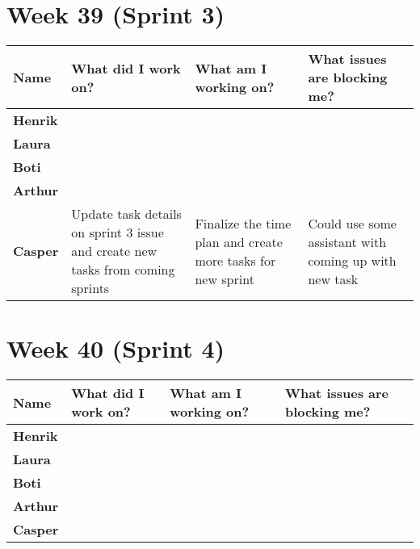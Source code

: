 \documentclass[landscape]{article}
\begin{document}
    \section{Week 39 (Sprint 3)}
    \begin{table}[H]
        \begin{center}
            \begin{tabularx}{\linewidth}{L|L|L|L}
                
                \textbf{Name} & \textbf{What did I work on?} & \textbf{What am I working on? }& \textbf{What issues are blocking me?} \\
                \hline
                \textbf{Henrik} &  &  &  \\
                \hline
                \textbf{Laura} & & & \\
                \hline
                \textbf{Boti} & & & \\
                \hline
                \textbf{Arthur} & & & \\
                \hline
                \textbf{Casper} & Update task details on sprint 3 issue and
                create new tasks from coming sprints & Finalize the time plan
                and create more tasks for new sprint & Could use some assistant
                with coming up with new task
            \end{tabularx}
        \end{center}
    \end{table}

    \section{Week 40 (Sprint 4)}
    \begin{table}[H]
        \begin{center}
            \begin{tabularx}{\linewidth}{L|L|L|L}
                
                \textbf{Name} & \textbf{What did I work on?} & \textbf{What am I working on? }& \textbf{What issues are blocking me?} \\
                \hline
                \textbf{Henrik} &  &  &  \\
                \hline
                \textbf{Laura} & & & \\
                \hline
                \textbf{Boti} & & & \\
                \hline
                \textbf{Arthur} & & & \\
                \hline
                \textbf{Casper} &  &  & 
            \end{tabularx}
        \end{center}
    \end{table}
\end{document}

